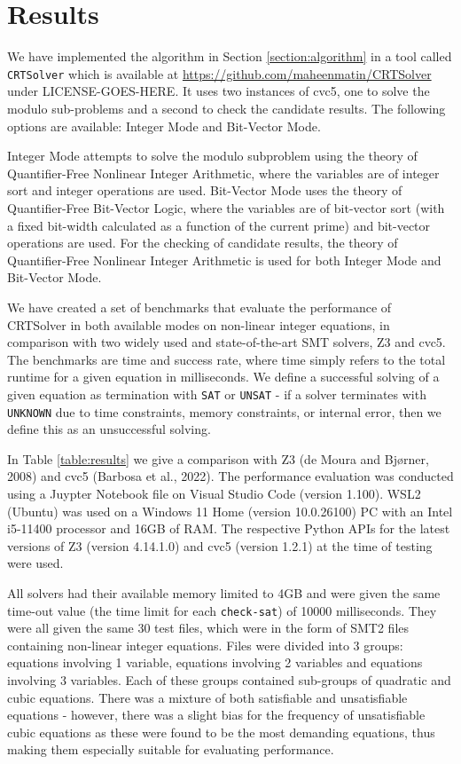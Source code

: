 \section{Results}
\label{section:results}

We have implemented the algorithm in Section \ref{section:algorithm}
in a tool called \texttt{CRTSolver} which is available at
\url{https://github.com/maheenmatin/CRTSolver} under LICENSE-GOES-HERE.
%
It uses two instances of cvc5, one to solve the modulo sub-problems
and a second to check the candidate results.  The following options
are available: Integer Mode and Bit-Vector Mode. 

Integer Mode attempts to
solve the modulo subproblem using the theory of Quantifier-Free Nonlinear
Integer Arithmetic, where the variables are of integer sort and integer
operations are used. 
Bit-Vector Mode uses the theory of Quantifier-Free
Bit-Vector Logic, where the variables are of bit-vector sort (with a fixed
bit-width calculated as a function of the current prime) and bit-vector
operations are used.
For the checking of candidate results, the theory of Quantifier-Free
Nonlinear Integer Arithmetic is used for both Integer Mode and Bit-Vector
Mode.

We have created a set of benchmarks that evaluate the performance of CRTSolver 
in both available modes on non-linear integer equations, in comparison with two
widely used and state-of-the-art SMT solvers, Z3 and cvc5.
The benchmarks are time and success rate, where time simply refers to the total runtime
for a given equation in milliseconds. We define a successful solving of a given
equation as termination with \texttt{SAT} or \texttt{UNSAT} - if a solver terminates
with \texttt{UNKNOWN} due to time constraints, memory constraints, or internal error,
then we define this as an unsuccessful solving.



In Table \ref{table:results} we give a comparison with Z3 (de Moura and Bj{\o}rner, 2008) and 
cvc5 (Barbosa et al., 2022). 
The performance evaluation was conducted using a Juypter Notebook file on Visual Studio Code (version 1.100).
WSL2 (Ubuntu) was used on a Windows 11 Home (version 10.0.26100) PC with an Intel i5-11400 processor and 
16GB of RAM. The respective Python APIs for the latest versions of Z3 (version 4.14.1.0) and cvc5 
(version 1.2.1) at the time of testing were used.

All solvers had their available memory limited to 4GB and were given the same time-out value 
(the time limit for each \texttt{check-sat}) of 10000 milliseconds. They were all given the same 30 test 
files, which were in the form of SMT2 files containing non-linear integer equations. Files were divided into 3 
groups: equations involving 1 variable, equations involving 2 variables and equations involving 3 variables. 
Each of these groups contained sub-groups of quadratic and cubic equations. There was a mixture of both 
satisfiable and unsatisfiable equations - however, there was a slight bias for the frequency of unsatisfiable 
cubic equations as these were found to be the most demanding equations, thus making them especially suitable 
for evaluating performance.

